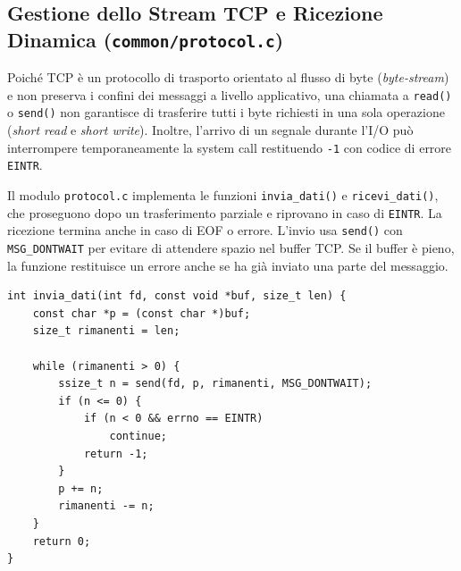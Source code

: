\documentclass[11pt,a4paper]{article}
\begin{document}
\begin{figure}[htbp]
\end{figure}

\clearpage

\subsection{Gestione dello Stream TCP e Ricezione Dinamica (\texttt{common/protocol.c})}

Poiché TCP è un protocollo di trasporto orientato al flusso di byte (\textit{byte-stream}) e non preserva i confini dei messaggi a livello applicativo, una chiamata a \texttt{read()} o \texttt{send()} non garantisce di trasferire tutti i byte richiesti in una sola operazione (\textit{short read} e \textit{short write}). Inoltre, l'arrivo di un segnale durante l'I/O può interrompere temporaneamente la system call restituendo \texttt{-1} con codice di errore \texttt{EINTR}.

Il modulo \texttt{protocol.c} implementa le funzioni \texttt{invia\_dati()} e \texttt{ricevi\_dati()}, che proseguono dopo un trasferimento parziale e riprovano in caso di \texttt{EINTR}. La ricezione termina anche in caso di EOF o errore. L'invio usa \texttt{send()} con \texttt{MSG\_DONTWAIT} per evitare di attendere spazio nel buffer TCP. Se il buffer è pieno, la funzione restituisce un errore anche se ha già inviato una parte del messaggio.

\begin{lstlisting}[style=cstyle]
int invia_dati(int fd, const void *buf, size_t len) {
    const char *p = (const char *)buf;
    size_t rimanenti = len;

    while (rimanenti > 0) {
        ssize_t n = send(fd, p, rimanenti, MSG_DONTWAIT);
        if (n <= 0) {
            if (n < 0 && errno == EINTR)
                continue;
            return -1;
        }
        p += n;
        rimanenti -= n;
    }
    return 0;
}
\end{lstlisting}
\end{document}
